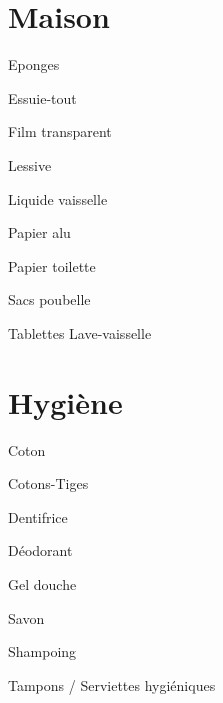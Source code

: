 \documentclass[8pt,landscape,a4paper]{article}
\begin{document}
\begin{multicols*}{4}
    \section{Maison}
    \begin{todolist}
    \item Eponges 
    \item Essuie-tout
    \item Film transparent
    \item Lessive
    \item Liquide vaisselle
    \item Papier alu
    \item Papier toilette
    \item Sacs poubelle
    \item Tablettes Lave-vaisselle
    \item 
    \item 
    \item 
    \item 
    \item 
    \item 
    \item 
    \item 
    \end{todolist}

    \section{Hygiène}
    \begin{todolist}
    \item Coton 
    \item Cotons-Tiges 
    \item Dentifrice
    \item Déodorant
    \item Gel douche
    \item Savon
    \item Shampoing
    \item Tampons / Serviettes hygiéniques 
    \item 
    \item 
    \item 
    \item 
    \item 
    \item 
    \item 
    \item 
    \item 
    \end{todolist}



    \end{multicols*}
\newpage
\end{document}
